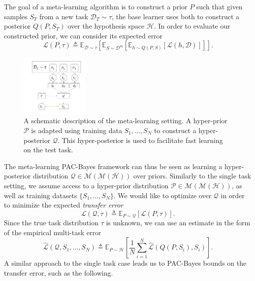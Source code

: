 \documentclass[letterpaper]{article} %
\theoremstyle{definition}
\newcommand{\Expect}[2]{\mathbb{E}_{#1}\left [#2 \right ]}
\begin{document}
The goal of a meta-learning algorithm is to construct a prior $P$ such that given samples $S_T$ from a new task $\mathcal{D}_T\sim \tau$, the base learner uses both to construct a posterior $Q(P, S_T)$ over the hypothesis space $\mathcal{H}$. In order to evaluate our constructed prior, we can consider its expected error
%
\begin{equation}
\mathcal{L}(P, \tau)\triangleq \Expect{\mathcal{D}\sim \tau}{\Expect{S\sim \mathcal{D}^m}{\Expect{h\sim Q(P, S)}{\mathcal{L}(h, \mathcal{D})}}} .
\end{equation}
%
\begin{figure}[t]
	\centering
	\includegraphics[width=0.3\textwidth]{setup_ml.PNG}
	\caption{A schematic description of the meta-learning setting. A hyper-prior $\mathcal{P}$ is adapted using training data $S_1,\ldots,S_N$ to construct a hyper-posterior $\mathcal{Q}$. This hyper-posterior is used to facilitate fast learning on the test task.}
	\label{fig:meta-learning-setting}
\end{figure}
%
The meta-learning PAC-Bayes framework can thus be seen as learning a hyper-posterior distribution $\mathcal{Q}\in \mathcal{M}(\mathcal{M}(\mathcal{H}))$ over priors. Similarly to the single task setting, we assume access to a hyper-prior distribution $\mathcal{P}\in \mathcal{M}(\mathcal{M}(\mathcal{H}))$, as well as training datasets $\{S_1,...,S_N\}$.
We would like to optimize over $\mathcal{Q}$ in order to minimize the expected \emph{transfer error} 
$$
\mathcal{L}(\mathcal{Q}, \tau) \triangleq \Expect{P\sim \mathcal{Q}}{\mathcal{L}(P, \tau)} .
$$
Since the true task distribution $\tau$ is unknown, we can use an estimate in the form of the empirical multi-task error $$\hat{\mathcal{L}}(\mathcal{Q}, S_1,...,S_N)\triangleq \Expect{P\sim \mathcal{H}}{\frac{1}{N}\sum_{i=1}^{N}\hat{\mathcal{L}}(Q(P, S_i), S_i)} .$$
A similar approach to the single task case leads us to PAC-Bayes bounds on the transfer error, such as the following.
\end{document}
